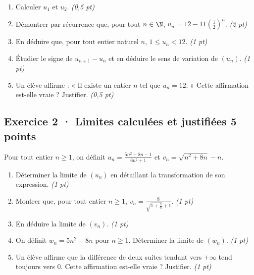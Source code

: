 \begin{enumerate}

\item Calculer $u_1$ et $u_2$. \hfill\textit{(0{,}5 pt)}

\item Démontrer par récurrence que, pour tout $n\in\N$, $u_n=12-11\left(\frac{1}{2}\right)^n$. \hfill\textit{(2 pt)}

\item En déduire que, pour tout entier naturel $n$, $1\le u_n<12$. \hfill\textit{(1 pt)}

\item Étudier le signe de $u_{n+1}-u_n$ et en déduire le sens de variation de $(u_n)$. \hfill\textit{(1 pt)}

\item Un élève affirme : « Il existe un entier $n$ tel que $u_n=12$. » Cette affirmation est-elle vraie ? Justifier. \hfill\textit{(0{,}5 pt)}

\end{enumerate}

\subsection*{Exercice 2 · Limites calculées et justifiées \hfill 5 points}Pour tout entier $n\ge1$, on définit $u_n=\frac{5n^2+8n-1}{6n^2+1}$ et $v_n=\sqrt{n^2+8n}-n$.

\begin{enumerate}

\item Déterminer la limite de $(u_n)$ en détaillant la transformation de son expression. \hfill\textit{(1 pt)}

\item Montrer que, pour tout entier $n\ge1$, $v_n=\frac{8}{\sqrt{1+\frac{8}n}+1}$. \hfill\textit{(1 pt)}

\item En déduire la limite de $(v_n)$. \hfill\textit{(1 pt)}

\item On définit $w_n=5n^2-8n$ pour $n\ge1$. Déterminer la limite de $(w_n)$. \hfill\textit{(1 pt)}

\item Un élève affirme que la différence de deux suites tendant vers $+\infty$ tend toujours vers $0$. Cette affirmation est-elle vraie ? Justifier. \hfill\textit{(1 pt)}

\end{enumerate}

